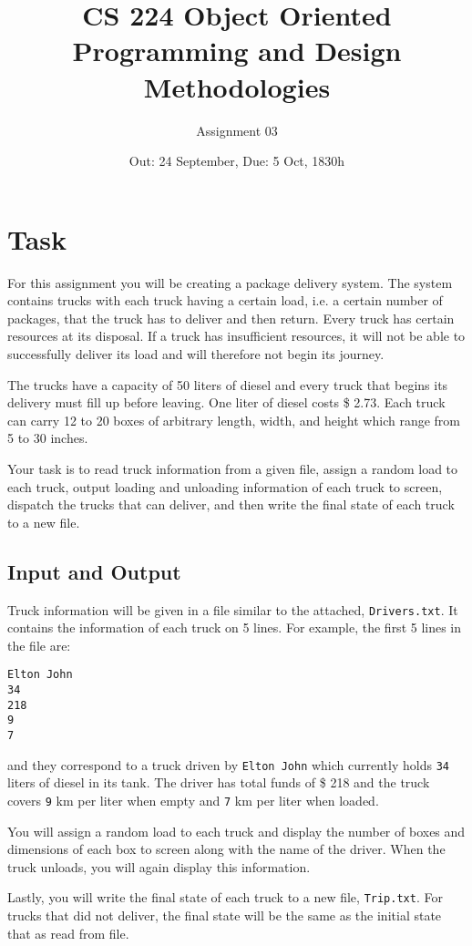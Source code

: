 \documentclass[a4paper,12pt]{article}
\title{CS 224 Object Oriented Programming and Design Methodologies}
\author{Assignment 03}
\date{Out: 24 September, Due: 5 Oct, 1830h}
\begin{document}
\maketitle

\section{Task}
For this assignment you will be creating a package delivery system. The system contains trucks with each truck having a certain load, i.e. a certain number of packages, that the truck has to deliver and then return. Every truck has certain resources at its disposal. If a truck has insufficient resources, it will not be able to successfully deliver its load and will therefore not begin its journey.

The trucks have a capacity of 50 liters of diesel and every truck that begins its delivery must fill up before leaving. One liter of diesel costs \$ 2.73. Each truck can carry 12 to 20 boxes of arbitrary length, width, and height which range from 5 to 30 inches. 

Your task is to read truck information from a given file, assign a random load to each truck, output loading and unloading information of each truck to screen, dispatch the trucks that can deliver, and then write the final state of each truck to a new file.

\subsection{Input and Output}

Truck information will be given in a file similar to the attached, {\tt Drivers.txt}. It contains the information of each truck on 5 lines. For example, the first 5 lines in the file are:
\begin{Verbatim}[frame=single]
Elton John
34
218
9
7
\end{Verbatim}
and they correspond to a truck driven by {\tt Elton John} which currently holds {\tt 34} liters of diesel in its tank. The driver has total funds of \$ 218 and the truck covers {\tt 9} km per liter when empty and {\tt 7} km per liter when loaded.

You will assign a random load to each truck and display the number of boxes and dimensions of each box to screen along with the name of the driver. When the truck unloads, you will again display this information.

Lastly, you will write the final state of each truck to a new file, {\tt Trip.txt}. For trucks that did not deliver, the final state will be the same as the initial state that as read from file.
\end{document}
